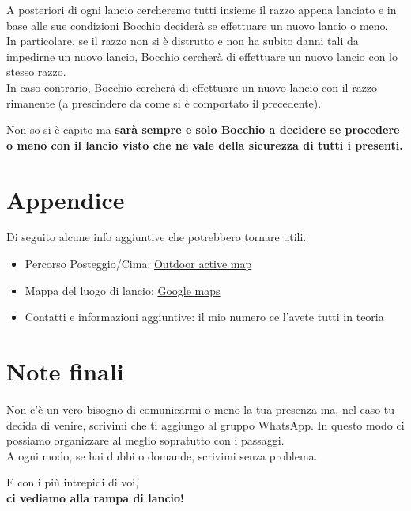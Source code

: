\documentclass[12pt, a4paper]{article}
\begin{document}
A posteriori di ogni lancio cercheremo tutti insieme il razzo appena lanciato e in base alle sue condizioni Bocchio deciderà se effettuare un nuovo lancio o meno.\\
In particolare, se il razzo non si è distrutto e non ha subito danni tali da impedirne un nuovo lancio, Bocchio cercherà di effettuare un nuovo lancio con lo stesso razzo.\\
In caso contrario, Bocchio cercherà di effettuare un nuovo lancio con il razzo rimanente (a prescindere da come si è comportato il precedente).

Non so si è capito ma \textbf{sarà sempre e solo Bocchio a decidere se procedere o meno con il lancio visto che ne vale della sicurezza di tutti i presenti.}


\section{Appendice}

Di seguito alcune info aggiuntive che potrebbero tornare utili.
\begin{itemize}
    \item Percorso Posteggio/Cima: \href{https://www.outdooractive.com/it/route/escursione/tutti-alla-rampa-di-lancio-/272397633/?share=%7Ezwmro7ue%244ossiiva}{Outdoor active map}
    \item Mappa del luogo di lancio: \href{https://www.google.com/maps/d/u/0/edit?mid=1mq_WNJcDX-Hdui0vGDH38mdwduJksQ8&usp=sharing}{Google maps}
    \item Contatti e informazioni aggiuntive: il mio numero ce l'avete tutti in teoria
\end{itemize}


\section{Note finali}

Non c'è un vero bisogno di comunicarmi o meno la tua presenza ma, nel caso tu decida di venire, scrivimi che ti aggiungo al gruppo WhatsApp.
In questo modo ci possiamo organizzare al meglio sopratutto con i passaggi.\\
A ogni modo, se hai dubbi o domande, scrivimi senza problema.\\


\begin{center}
    \huge E con i più intrepidi di voi,\\
    \textbf{ci vediamo alla rampa di lancio!}
\end{center}
\end{document}
